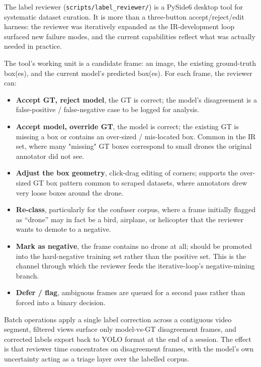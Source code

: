 \documentclass[12pt,a4paper,oneside,openright]{book}
\begin{document}
The label reviewer (\texttt{scripts/label\_reviewer/}) is a PySide6 desktop tool for systematic dataset curation. It is more than a three-button accept/reject/edit harness: the reviewer was iteratively expanded as the IR-development loop surfaced new failure modes, and the current capabilities reflect what was actually needed in practice.

The tool's working unit is a candidate frame: an image, the existing ground-truth box(es), and the current model's predicted box(es). For each frame, the reviewer can:

\begin{itemize}
    \item \textbf{Accept GT, reject model}, the GT is correct; the model's disagreement is a false-positive / false-negative case to be logged for analysis.
    \item \textbf{Accept model, override GT}, the model is correct; the existing GT is missing a box or contains an over-sized / mis-located box. Common in the IR set, where many "missing" GT boxes correspond to small drones the original annotator did not see.
    \item \textbf{Adjust the box geometry}, click-drag editing of corners; supports the over-sized GT box pattern common to scraped datasets, where annotators drew very loose boxes around the drone.
    \item \textbf{Re-class}, particularly for the confuser corpus, where a frame initially flagged as ``drone'' may in fact be a bird, airplane, or helicopter that the reviewer wants to demote to a negative.
    \item \textbf{Mark as negative}, the frame contains no drone at all; should be promoted into the hard-negative training set rather than the positive set. This is the channel through which the reviewer feeds the iterative-loop's negative-mining branch.
    \item \textbf{Defer / flag}, ambiguous frames are queued for a second pass rather than forced into a binary decision.
\end{itemize}

Batch operations apply a single label correction across a contiguous video segment, filtered views surface only model-vs-GT disagreement frames, and corrected labels export back to YOLO format at the end of a session. The effect is that reviewer time concentrates on disagreement frames, with the model's own uncertainty acting as a triage layer over the labelled corpus.
\end{document}
